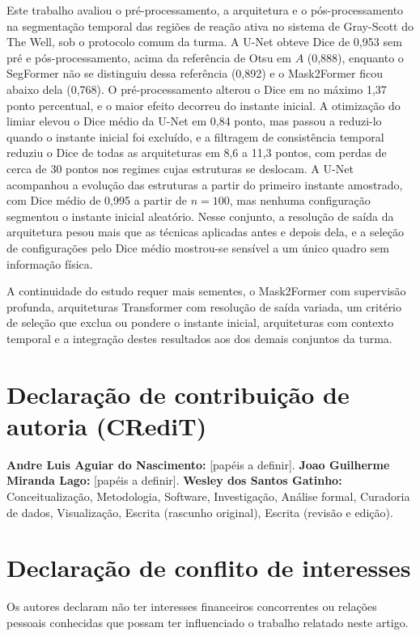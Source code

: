 \documentclass[final,5p,times,twocolumn]{elsarticle}
\begin{document}
Este trabalho avaliou o pré-processamento, a arquitetura e o pós-processamento na segmentação temporal das regiões de reação ativa no sistema de Gray-Scott do The Well, sob o protocolo comum da turma. A U-Net obteve Dice de 0,953 sem pré e pós-processamento, acima da referência de Otsu em $A$ (0,888), enquanto o SegFormer não se distinguiu dessa referência (0,892) e o Mask2Former ficou abaixo dela (0,768). O pré-processamento alterou o Dice em no máximo 1,37 ponto percentual, e o maior efeito decorreu do instante inicial. A otimização do limiar elevou o Dice médio da U-Net em 0,84 ponto, mas passou a reduzi-lo quando o instante inicial foi excluído, e a filtragem de consistência temporal reduziu o Dice de todas as arquiteturas em 8,6 a 11,3 pontos, com perdas de cerca de 30 pontos nos regimes cujas estruturas se deslocam. A U-Net acompanhou a evolução das estruturas a partir do primeiro instante amostrado, com Dice médio de 0,995 a partir de $n=100$, mas nenhuma configuração segmentou o instante inicial aleatório. Nesse conjunto, a resolução de saída da arquitetura pesou mais que as técnicas aplicadas antes e depois dela, e a seleção de configurações pelo Dice médio mostrou-se sensível a um único quadro sem informação física.

A continuidade do estudo requer mais sementes, o Mask2Former com supervisão profunda, arquiteturas Transformer com resolução de saída variada, um critério de seleção que exclua ou pondere o instante inicial, arquiteturas com contexto temporal e a integração destes resultados aos dos demais conjuntos da turma.

\section*{Declaração de contribuição de autoria (CRediT)}
\textbf{Andre Luis Aguiar do Nascimento:} [papéis a definir].
\textbf{Joao Guilherme Miranda Lago:} [papéis a definir].
\textbf{Wesley dos Santos Gatinho:} Conceitualização, Metodologia, Software, Investigação, Análise formal, Curadoria de dados, Visualização, Escrita (rascunho original), Escrita (revisão e edição).

\section*{Declaração de conflito de interesses}
Os autores declaram não ter interesses financeiros concorrentes ou relações pessoais conhecidas que possam ter influenciado o trabalho relatado neste artigo.
\end{document}
